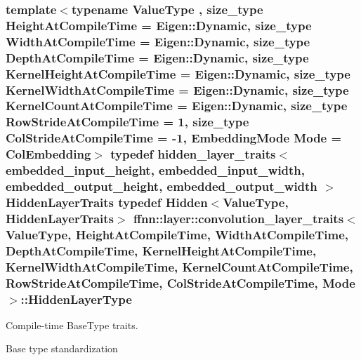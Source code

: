 \hypertarget{structffnn_1_1layer_1_1convolution__layer__traits_a53bf482ee85839d3c314180598c931b4}{
\subsubsection[{Hidden\-Layer\-Type}]{\setlength{\rightskip}{0pt plus 5cm}template$<$typename Value\-Type , size\-\_\-type Height\-At\-Compile\-Time = Eigen\-::\-Dynamic, size\-\_\-type Width\-At\-Compile\-Time = Eigen\-::\-Dynamic, size\-\_\-type Depth\-At\-Compile\-Time = Eigen\-::\-Dynamic, size\-\_\-type Kernel\-Height\-At\-Compile\-Time = Eigen\-::\-Dynamic, size\-\_\-type Kernel\-Width\-At\-Compile\-Time = Eigen\-::\-Dynamic, size\-\_\-type Kernel\-Count\-At\-Compile\-Time = Eigen\-::\-Dynamic, size\-\_\-type Row\-Stride\-At\-Compile\-Time = 1, size\-\_\-type Col\-Stride\-At\-Compile\-Time = -\/1, Embedding\-Mode Mode = Col\-Embedding$>$ typedef {\bf hidden\-\_\-layer\-\_\-traits}$<$ {\bf embedded\-\_\-input\-\_\-height}, {\bf embedded\-\_\-input\-\_\-width}, {\bf embedded\-\_\-output\-\_\-height}, {\bf embedded\-\_\-output\-\_\-width} $>$ Hidden\-Layer\-Traits typedef {\bf Hidden}$<$Value\-Type, Hidden\-Layer\-Traits$>$ {\bf ffnn\-::layer\-::convolution\-\_\-layer\-\_\-traits}$<$ Value\-Type, Height\-At\-Compile\-Time, Width\-At\-Compile\-Time, Depth\-At\-Compile\-Time, Kernel\-Height\-At\-Compile\-Time, Kernel\-Width\-At\-Compile\-Time, Kernel\-Count\-At\-Compile\-Time, Row\-Stride\-At\-Compile\-Time, Col\-Stride\-At\-Compile\-Time, Mode $>$\-::{\bf Hidden\-Layer\-Type}}}\label{structffnn_1_1layer_1_1convolution__layer__traits_a53bf482ee85839d3c314180598c931b4}


Compile-\/time Base\-Type traits. 

Base type standardization 

